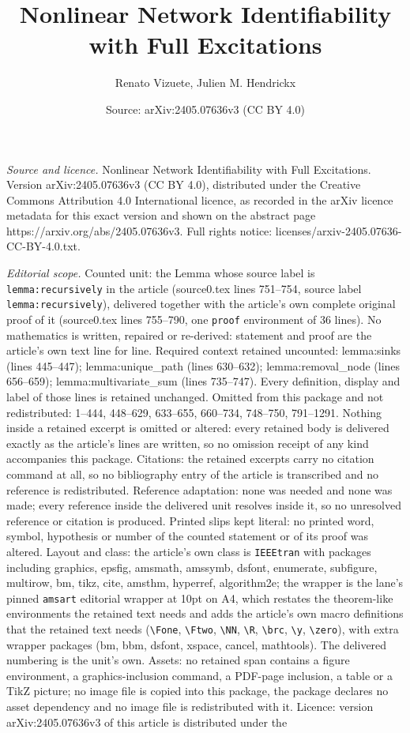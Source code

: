 \documentclass[10pt,a4paper]{amsart}
\title[Nonlinear Network Identifiability with Full Excitations]{Nonlinear Network Identifiability with Full Excitations}
\author{Renato Vizuete, Julien M. Hendrickx}
\date{Source: arXiv:2405.07636v3 (CC BY 4.0)}
\begin{document}
\maketitle

\noindent\emph{Source and licence.} Nonlinear Network Identifiability with Full Excitations. Version arXiv:2405.07636v3 (CC BY 4.0), distributed under the Creative Commons Attribution 4.0 International licence, as recorded in the arXiv licence metadata for this exact version and shown on the abstract page https://arxiv.org/abs/2405.07636v3. Full rights notice: licenses/arxiv-2405.07636-CC-BY-4.0.txt.\par\smallskip

\noindent\textit{Editorial scope.} Counted unit: the Lemma whose source label is \texttt{lemma:recursively} in the article (source0.tex lines 751--754, source label \texttt{lemma:recursively}), delivered together with the article's own complete original proof of it (source0.tex lines 755--790, one \texttt{proof} environment of 36 lines). No mathematics is written, repaired or re-derived: statement and proof are the article's own text line for line. Required context retained uncounted: lemma:sinks (lines 445--447); lemma:unique\_path (lines 630--632); lemma:removal\_node (lines 656--659); lemma:multivariate\_sum (lines 735--747). Every definition, display and label of those lines is retained unchanged. Omitted from this package and not redistributed: 1--444, 448--629, 633--655, 660--734, 748--750, 791--1291. Nothing inside a retained excerpt is omitted or altered: every retained body is delivered exactly as the article's lines are written, so no omission receipt of any kind accompanies this package. Citations: the retained excerpts carry no citation command at all, so no bibliography entry of the article is transcribed and no reference is redistributed. Reference adaptation: none was needed and none was made; every reference inside the delivered unit resolves inside it, so no unresolved reference or citation is produced. Printed slips kept literal: no printed word, symbol, hypothesis or number of the counted statement or of its proof was altered. Layout and class: the article's own class is \texttt{IEEEtran} with packages including graphics, epsfig, amsmath, amssymb, dsfont, enumerate, subfigure, multirow, bm, tikz, cite, amsthm, hyperref, algorithm2e; the wrapper is the lane's pinned \texttt{amsart} editorial wrapper at 10pt on A4, which restates the theorem-like environments the retained text needs and adds the article's own macro definitions that the retained text needs (\texttt{\textbackslash Fone}, \texttt{\textbackslash Ftwo}, \texttt{\textbackslash NN}, \texttt{\textbackslash R}, \texttt{\textbackslash brc}, \texttt{\textbackslash y}, \texttt{\textbackslash zero}), with extra wrapper packages (bm, bbm, dsfont, xspace, cancel, mathtools). The delivered numbering is the unit's own. Assets: no retained span contains a figure environment, a graphics-inclusion command, a PDF-page inclusion, a table or a TikZ picture; no image file is copied into this package, the package declares no asset dependency and no image file is redistributed with it. Licence: version arXiv:2405.07636v3 of this article is distributed under the 
\end{document}
